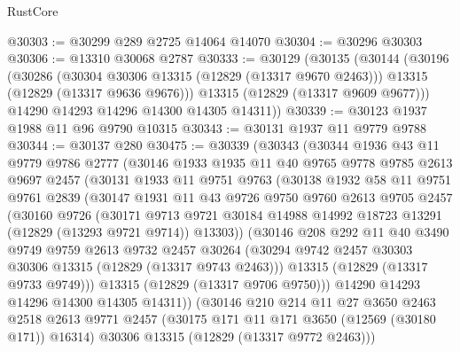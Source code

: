 \begin{lexlean}{RustCore}
\begin{coremodule}
@30303 := @30299 @289 @2725 @14064 @14070
@30304 := @30296 @30303
@30306 := @13310 @30068 @2787
@30333 := @30129
    (@30135
      (@30144
        (@30196
          (@30286
            (@30304 @30306 @13315 (@12829 (@13317 @9670 @2463)))
            @13315
            (@12829 (@13317 @9636 @9676)))
          @13315
          (@12829 (@13317 @9609 @9677)))
        @14290
        @14293
        @14296
        @14300
        @14305
        @14311))
@30339 := @30123 @1937 @1988 @11 @96 @9790 @10315
@30343 := @30131 @1937 @11 @9779 @9788
@30344 := @30137 @280
@30475 := @30339
    (@30343
      (@30344
        @1936
        @43
        @11
        @9779
        @9786
        @2777
        (@30146
          @1933
          @1935
          @11
          @40
          @9765
          @9778
          @9785
          @2613
          @9697
          @2457
          (@30131
            @1933
            @11
            @9751
            @9763
            (@30138
              @1932
              @58
              @11
              @9751
              @9761
              @2839
              (@30147
                @1931
                @11
                @43
                @9726
                @9750
                @9760
                @2613
                @9705
                @2457
                (@30160
                  @9726
                  (@30171
                    @9713
                    @9721
                    @30184
                    @14988
                    @14992
                    @18723
                    @13291
                    (@12829 (@13293 @9721 @9714))
                    @13303))
                (@30146
                  @208
                  @292
                  @11
                  @40
                  @3490
                  @9749
                  @9759
                  @2613
                  @9732
                  @2457
                  @30264
                  (@30294 @9742 @2457 @30303 @30306 @13315 (@12829 (@13317 @9743 @2463)))
                  @13315
                  (@12829 (@13317 @9733 @9749)))
                @13315
                (@12829 (@13317 @9706 @9750)))
              @14290
              @14293
              @14296
              @14300
              @14305
              @14311))
          (@30146
            @210
            @214
            @11
            @27
            @3650
            @2463
            @2518
            @2613
            @9771
            @2457
            (@30175 @171 @11 @171 @3650 (@12569 (@30180 @171)) @16314)
            @30306
            @13315
            (@12829 (@13317 @9772 @2463)))

\end{coremodule}
\end{lexlean}
